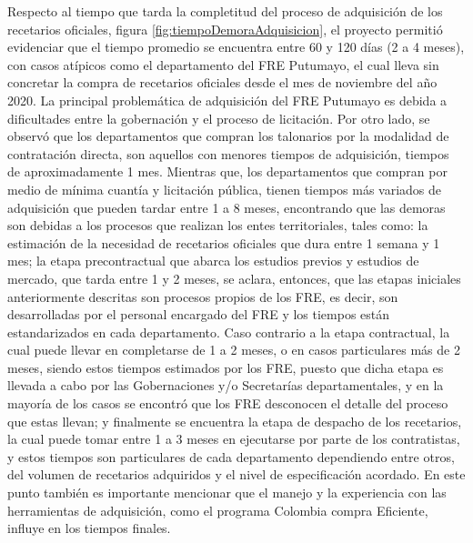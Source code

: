 \documentclass[
]{book}
\begin{document}
Respecto al tiempo que tarda la completitud del proceso de adquisición de los recetarios oficiales, figura \ref{fig:tiempoDemoraAdquisicion}, el proyecto permitió evidenciar que el tiempo promedio se encuentra entre 60 y 120 días (2 a 4 meses), con casos atípicos como el departamento del FRE Putumayo, el cual lleva sin concretar la compra de recetarios oficiales desde el mes de noviembre del año 2020. La principal problemática de adquisición del FRE Putumayo es debida a dificultades entre la gobernación y el proceso de licitación. Por otro lado, se observó que los departamentos que compran los talonarios por la modalidad de contratación directa, son aquellos con menores tiempos de adquisición, tiempos de aproximadamente 1 mes. Mientras que, los departamentos que compran por medio de mínima cuantía y licitación pública, tienen tiempos más variados de adquisición que pueden tardar entre 1 a 8 meses, encontrando que las demoras son debidas a los procesos que realizan los entes territoriales, tales como: la estimación de la necesidad de recetarios oficiales que dura entre 1 semana y 1 mes; la etapa precontractual que abarca los estudios previos y estudios de mercado, que tarda entre 1 y 2 meses, se aclara, entonces, que las etapas iniciales anteriormente descritas son procesos propios de los FRE, es decir, son desarrolladas por el personal encargado del FRE y los tiempos están estandarizados en cada departamento. Caso contrario a la etapa contractual, la cual puede llevar en completarse de 1 a 2 meses, o en casos particulares más de 2 meses, siendo estos tiempos estimados por los FRE, puesto que dicha etapa es llevada a cabo por las Gobernaciones y/o Secretarías departamentales, y en la mayoría de los casos se encontró que los FRE desconocen el detalle del proceso que estas llevan; y finalmente se encuentra la etapa de despacho de los recetarios, la cual puede tomar entre 1 a 3 meses en ejecutarse por parte de los contratistas, y estos tiempos son particulares de cada departamento dependiendo entre otros, del volumen de recetarios adquiridos y el nivel de especificación acordado. En este punto también es importante mencionar que el manejo y la experiencia con las herramientas de adquisición, como el programa Colombia compra Eficiente, influye en los tiempos finales.
\end{document}
